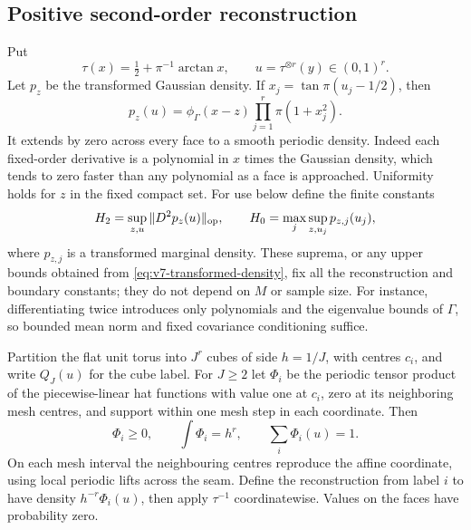 \subsection{Positive second-order reconstruction}
Put
\begin{equation}
 \tau(x)=\tfrac12+\pi^{-1}\arctan x,
 \qquad u=\tau^{\otimes r}(y)\in(0,1)^r.               \label{eq:v7-compactification}
\end{equation}
Let $p_z$ be the transformed Gaussian density. If $x_j=\tan\pi(u_j-1/2)$,
then
\begin{equation}
 p_z(u)=\phi_\Gamma(x-z)\prod_{j=1}^r\pi(1+x_j^2).     \label{eq:v7-transformed-density}
\end{equation}
It extends by zero across every face to a smooth periodic density.
Indeed each fixed-order derivative is a polynomial in $x$ times the
Gaussian density, which tends to zero faster than any polynomial as a
face is approached. Uniformity holds for $z$ in the fixed compact set.
For use below define the finite constants
\begin{equation}
 H_2=\sup_{z,u}\|D^2p_z(u)\|_{\rm op},\qquad
 H_0=\max_j\sup_{z,u_j}p_{z,j}(u_j),                    \label{eq:v7-Hconstants}
\end{equation}
where $p_{z,j}$ is a transformed marginal density. These suprema, or
any upper bounds obtained from \eqref{eq:v7-transformed-density}, fix
all the reconstruction and boundary constants; they do not depend on
$M$ or sample size. For instance, differentiating twice introduces only
polynomials and the eigenvalue bounds of $\Gamma$, so bounded mean
norm and fixed covariance conditioning suffice.

Partition the flat unit torus into $J^r$ cubes of side $h=1/J$, with
centres $c_i$, and write $Q_J(u)$ for the cube label. For $J\ge2$ let
$\Phi_i$ be the periodic tensor product of the piecewise-linear hat
functions with value one at $c_i$, zero at its neighboring mesh centres,
and support within one mesh step in each coordinate. Then
\[
 \Phi_i\ge0,\qquad \int\Phi_i=h^r,\qquad
 \sum_i\Phi_i(u)=1.
\]
On each mesh interval the neighbouring centres reproduce the affine
coordinate, using local periodic lifts across the seam. Define the
reconstruction from label $i$ to have density $h^{-r}\Phi_i(u)$,
then apply $\tau^{-1}$ coordinatewise. Values on the faces have
probability zero.

